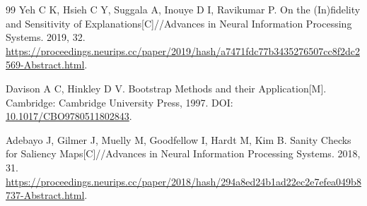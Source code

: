 {\begin{thebibliography}{99}
 Yeh C K, Hsieh C Y, Suggala A, Inouye D I, Ravikumar P. On the (In)fidelity and Sensitivity of Explanations[C]//Advances in Neural Information Processing Systems. 2019, 32. \url{https://proceedings.neurips.cc/paper/2019/hash/a7471fdc77b3435276507cc8f2dc2569-Abstract.html}.

 Davison A C, Hinkley D V. Bootstrap Methods and their Application[M]. Cambridge: Cambridge University Press, 1997. DOI: \url{10.1017/CBO9780511802843}.

 Adebayo J, Gilmer J, Muelly M, Goodfellow I, Hardt M, Kim B. Sanity Checks for Saliency Maps[C]//Advances in Neural Information Processing Systems. 2018, 31. \url{https://proceedings.neurips.cc/paper/2018/hash/294a8ed24b1ad22ec2e7efea049b8737-Abstract.html}.


\end{thebibliography}
}
